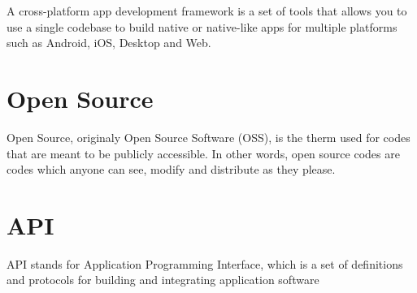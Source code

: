 
A cross-platform app development framework is a set of tools that allows you to use a single codebase to build native or native-like apps for multiple platforms such as Android, iOS, Desktop and Web.

\section{Open Source }
\label{sub:open_source}

Open Source, originaly Open Source Software (OSS), is the therm used for codes that are meant to be publicly accessible. In other words, open source codes are codes which anyone can see, modify and distribute as they please. %


\section{API}
\label{sub:api}

API stands for Application Programming Interface, which is a set of definitions and protocols for building and integrating application software


